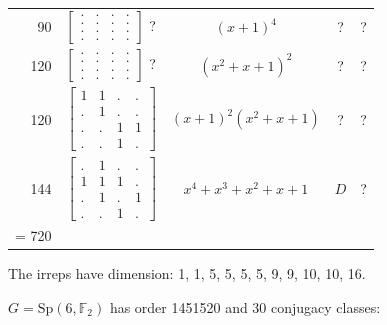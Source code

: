 \documentclass[11pt,oneside]{article}
\newcommand{\Sp}{\mathrm{Sp}}
\newcommand{\Field}{\mathbb{F}}
\begin{document}
\begin{center}
\begin{tabular}{r|l|c|c|c}
90  & $\begin{bmatrix}.&.&.&.\\.&.&.&.\\.&.&.&.\\.&.&.&.\end{bmatrix}$  ?  & $(x+1)^4$  & ? & ?  \\
120  & $\begin{bmatrix}.&.&.&.\\.&.&.&.\\.&.&.&.\\.&.&.&.\end{bmatrix}$ ?   & $(x^2+x+1)^2$  & ? & ?  \\
120  & $\begin{bmatrix}1&1&.&.\\.&1&.&.\\.&.&1&1\\.&.&1&.\end{bmatrix}$     & $(x+1)^2(x^2+x+1)$  & ? & ?  \\
144  & $\begin{bmatrix}.&1&.&.\\1&1&1&.\\.&1&.&1\\.&.&1&.\end{bmatrix}$    & $x^4+x^3+x^2+x+1$  & $D$ & ?  \\
\hline
\strut = 720 \\
\end{tabular}
\end{center}
The irreps have dimension: 1, 1, 5, 5, 5, 5, 9, 9, 10, 10, 16.

$G = \Sp(6,\Field_2)$  has order 1451520 and 30 conjugacy classes:
\end{document}
